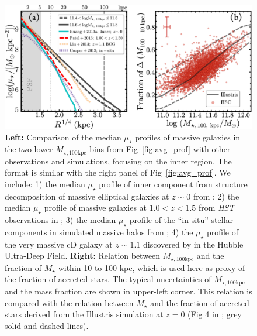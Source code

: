 \documentclass[a4paper,fleqn,usenatbib]{mnras}
\def\mstar{{$M_{\star}$}}
\def\mtot{{$M_{\star,100\mathrm{kpc}}$}}
\def\mden{{$\mu_{\star}$}}
\begin{document}
  \begin{figure}
      \centering 
      \includegraphics[width=\textwidth]{fig/redbcg_insitu_accretion}
      \caption{
          \textbf{Left:}
          Comparison of the median \mden{} profiles of massive galaxies in the 
          two lower \mtot{} bins from Fig~\ref{fig:avg_prof} with other observations 
          and simulations, focusing on the inner region. 
          The format is similar with the right panel of Fig~\ref{fig:avg_prof}.
          We include: 
          1) the median \mden{} profile of inner component from structure 
          decomposition of massive elliptical galaxies at $z{\sim} 0$ from 
          \citet[][Cyan, solid]{Huang2013a}; 
          2) the median \mden{} profile of massive galaxies at $1.0 < z < 1.5$ 
          from \textit{HST} observations in \citet[][Red, dashed]{Patel2013}; 
          3) the median \mden{} profile of the ``in-situ'' stellar components in 
          simulated massive halos from \citet[][Purple, dot-dashed]{Cooper2013};
          4) the \mden{} profile of the very massive cD galaxy at $z{\sim} 1.1$ 
          discovered by \citet[][Yellow, dashed]{Liu2013} in the Hubble 
          Ultra-Deep Field.
          \textbf{Right:}
          Relation between \mtot{} and the fraction of \mstar{} within 10 to 100 kpc, 
          which is used here as proxy of the fraction of accreted stars. 
          The typical uncertainties of \mtot{} and the mass fraction are shown in 
          upper-left corner. 
          This relation is compared with the relation between \mstar{} and the fraction
          of accreted stars derived from the Illustris simulation at $z=0$ 
          (Fig 4 in \citealt{RodriguezGomez2016}; grey solid and dashed lines). 
          }
      \label{fig:discussion_1}
  \end{figure}
\end{document}
